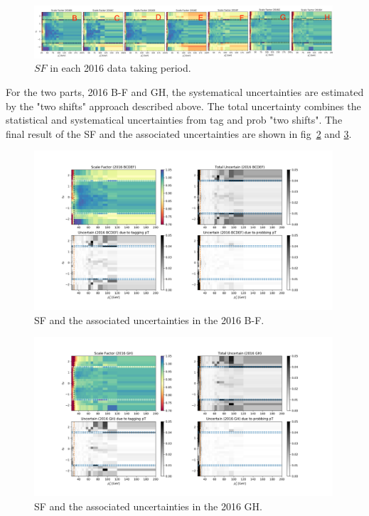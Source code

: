 \begin{figure}
    \centering
    \includegraphics[width=0.99\textwidth]{chapters/Analysis/sectionCalibration/figures/eTrigger/result_period.png}
    \caption{$SF$ in each 2016 data taking period.}
    \label{fig:appendix:ele27SFperiods}
\end{figure}





For the two parts, 2016 B-F and GH, the systematical uncertainties are estimated by the "two shifts" approach described above. The total uncertainty combines the statistical and systematical uncertainties from tag and prob "two shifts". The final result of the SF and the associated uncertainties are shown in fig~\ref{fig:eTrSF_err_BCDEF} and \ref{fig:eTrSF_err_GH}.

\begin{figure}
    \centering
    \includegraphics[width=0.99\textwidth]{chapters/Analysis/sectionCalibration/figures/eTrigger/result_BCDEF.png}
    \caption{SF and the associated uncertainties in the 2016 B-F.}
    \label{fig:eTrSF_err_BCDEF}
\end{figure}

\begin{figure}
    \centering
    \includegraphics[width=0.99\textwidth]{chapters/Analysis/sectionCalibration/figures/eTrigger/result_GH.png}
    \caption{SF and the associated uncertainties in the 2016 GH.}
    \label{fig:eTrSF_err_GH}
\end{figure}

